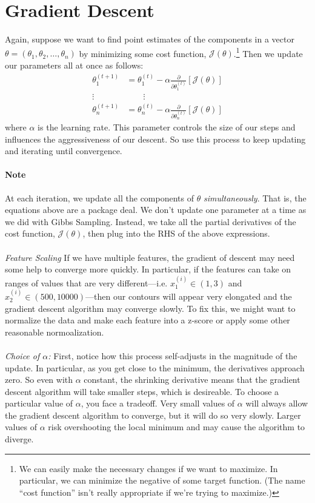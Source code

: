 \documentclass[12pt]{article}
\begin{document}
\section{Gradient Descent}

Again, suppose we want to find point estimates of the components in
a vector $\theta = (\theta_1, \theta_2, \ldots, \theta_n)$ by
minimizing some cost function, $\mathcal{J}(\theta)$.\footnote{We
can easily make the necessary changes if we want to maximize. In
particular, we can minimize the negative of some target function. (The
name ``cost function'' isn't really appropriate if we're trying to 
maximize.)} Then we update our parameters all at once as follows:
\begin{align*}
   \theta_1^{(t+1)} &= \theta_1^{(t)} - \alpha \frac{\partial}{
      \partial \theta_1^{(t)}}\left[ \mathcal{J}(\theta)\right]\\
   \vdots \qquad & \qquad \vdots \\
   \theta_n^{(t+1)} &= \theta_n^{(t)} - \alpha \frac{\partial}{
      \partial \theta_n^{(t)}}\left[ \mathcal{J}(\theta)\right]
\end{align*}
where $\alpha$ is the learning rate. This parameter controls the
size of our steps and influences the aggressiveness of our 
descent. So use this process to keep updating and iterating 
until convergence.  

\paragraph{Note} At each iteration, we update all the components of 
$\theta$ \emph{simultaneously}. That is, the equations above are a 
package deal. We don't update one parameter at a time as we did
with Gibbs Sampling. Instead, we take all the partial derivatives
of the cost function, $\mathcal{J}(\theta)$, then plug into the RHS
of the above expressions.
\\
\\
{\sl Feature Scaling} If we have multiple features, the gradient
of descent may need some help to converge more quickly.  In particular,
if the features can take on ranges of values that are very 
different---i.e. $x_1^{(i)} \in (1,3)$ and $x_2^{(i)} 
\in (500,10000)$---then our contours will appear very elongated and the
gradient descent algorithm may converge slowly.  To fix this, we might
want to normalize the data and make each feature into a z-score or
apply some other reasonable normoalization.
\\
\\
{\sl Choice of $\alpha$:} First, notice how this process 
self-adjusts in the
magnitude of the update.  In particular, as you get close to
the minimum, the derivatives approach zero.  So even with 
$\alpha$ constant, the shrinking derivative means that the gradient
descent algorithm will take smaller steps, which is desireable.
To choose a particular value of $\alpha$, you face a tradeoff. Very
small values of $\alpha$ will always allow the gradient descent 
algorithm to converge, but it will do so very slowly.  Larger values
of $\alpha$ risk overshooting the local minimum and may cause the 
algorithm to diverge.
\end{document}

